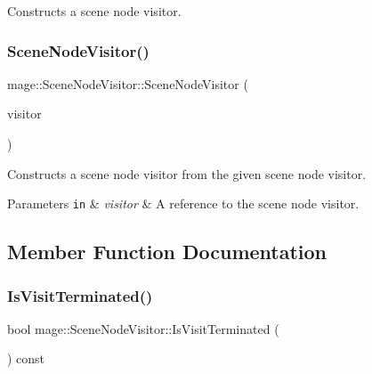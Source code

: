 Constructs a scene node visitor. \hypertarget{classmage_1_1_scene_node_visitor_a44e30ba9858c231f4bad0a2b7fffbe29}{}\label{classmage_1_1_scene_node_visitor_a44e30ba9858c231f4bad0a2b7fffbe29} 
\subsubsection{\texorpdfstring{Scene\+Node\+Visitor()}{SceneNodeVisitor()}\hspace{0.1cm}{\footnotesize\ttfamily [2/2]}}
{\footnotesize\ttfamily mage\+::\+Scene\+Node\+Visitor\+::\+Scene\+Node\+Visitor (\begin{DoxyParamCaption}\item[{const \hyperlink{classmage_1_1_scene_node_visitor}{Scene\+Node\+Visitor} \&}]{visitor }\end{DoxyParamCaption})\hspace{0.3cm}{\ttfamily [protected]}}

Constructs a scene node visitor from the given scene node visitor.


\begin{DoxyParams}[1]{Parameters}
\mbox{\tt in}  & {\em visitor} & A reference to the scene node visitor. \\
\hline
\end{DoxyParams}


\subsection{Member Function Documentation}
\hypertarget{classmage_1_1_scene_node_visitor_a0f654e306f6d43d49081f319cd41812b}{}\label{classmage_1_1_scene_node_visitor_a0f654e306f6d43d49081f319cd41812b} 
\subsubsection{\texorpdfstring{Is\+Visit\+Terminated()}{IsVisitTerminated()}}
{\footnotesize\ttfamily bool mage\+::\+Scene\+Node\+Visitor\+::\+Is\+Visit\+Terminated (\begin{DoxyParamCaption}{ }\end{DoxyParamCaption}) const}

